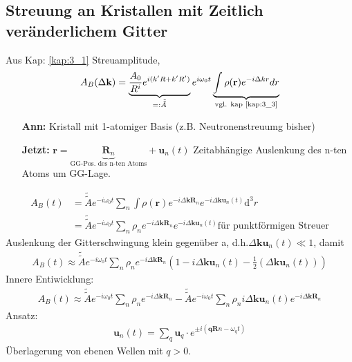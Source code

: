 \subsection{Streuung an Kristallen mit Zeitlich veränderlichem Gitter} \label{kap:4_3}
 Aus Kap: \ref{kap:3_1} Streuamplitude,
\begin{align*}
	A_B(\Delta \textbf{k})= \underbrace{\frac{A_0}{R^i}e^{i(k'R+k'R')}}_{=: \tilde{\tilde{A}}} e^{i\omega_0t} \underbrace{\int \rho(\textbf{r})e^{-i\Delta kr} dr}_{\text{vgl. kap \ref{kap:3_3}}}
\end{align*}
\begin{itemize}
	\item[\textbf{Ann:}] Kristall mit 1-atomiger Basis (z.B. Neutronenstreuumg bisher)
	\item[\textbf{Jetzt:}] $\textbf{r} = \underbrace{\textbf{R}_n}_{\text{GG-Pos. des n-ten Atoms}} + \textbf{u}_n(t)$ Zeitabhängige Auslenkung des n-ten Atoms um GG-Lage.
\end{itemize}
\begin{align*}
	A_B(t) &= \tilde{\tilde{A}} e^{-i\omega_0 t} \sum_n \int \rho(\textbf{r}) e^{-i\Delta \textbf{k} \textbf{R}_n } e^{-i\Delta \textbf{k} \textbf{u}_n(t)} \mathrm{d}^3r\\
	&= \tilde{\tilde{A}} e^{-i\omega_0 t} \sum_n \rho_n e^{-i\Delta \textbf{k} \textbf{R}_n } e^{-i\Delta \textbf{k} \textbf{u}_n(t)} \text{für punktförmigen Streuer}
\end{align*}
Auslenkung der Gitterschwingung klein gegenüber a, d.h.$\Delta \textbf{k} \textbf{u}_n(t) \ll 1$, damit
\begin{align*}
	A_B(t) \approx \tilde{\tilde{A}} e^{-i\omega_0 t} \sum_n \rho_n e^{-i\Delta \textbf{k} \textbf{R}_n } \left(  1 -i\Delta \textbf{k} \textbf{u}_n(t) - \frac{1}{2}(\Delta \textbf{k} \textbf{u}_n(t))\right)
\end{align*}
Innere Entiwicklung:
\begin{align*}
	A_B(t) \approx \tilde{\tilde{A}} e^{-i\omega_0 t} \sum_n \rho_n e^{-i\Delta \textbf{k} \textbf{R}_n } - \tilde{\tilde{A}} e^{-i\omega_0 t} \sum_n \rho_n i\Delta \textbf{k} \textbf{u}_n(t) e^{-i\Delta \textbf{k} \textbf{R}_n}
\end{align*}
Ansatz: 
\begin{align*}
	\textbf{u}_n(t) = \sum_q \textbf{u}_q \cdot e^{\pm i(\textbf{q} \textbf{R} n - \omega_q t)}
\end{align*}
Überlagerung von ebenen Wellen mit $q > 0$.

